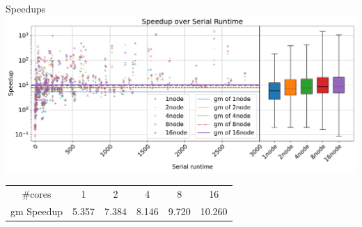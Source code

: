 \documentclass{beamer}
\begin{document}
\begin{frame}{Speedups}
    \center
    \includegraphics[scale=.3]{plots/speedups_gim.pdf}
    
    \begin{table}[!h]
        \center
        \begin{tabular}{ cccccc }
          \toprule
          \#cores & 1 & 2 & 4 & 8 & 16 \\
          gm Speedup & 5.357 & 7.384 & 8.146 & 9.720 & 10.260 \\
          \bottomrule
        \end{tabular}
    \end{table}
\end{frame}
\end{document}
